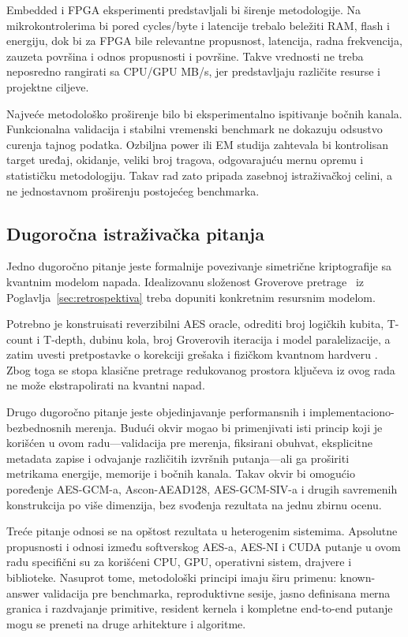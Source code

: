 Embedded i FPGA eksperimenti predstavljali bi širenje metodologije.
Na mikrokontrolerima bi pored cycles/byte i latencije trebalo beležiti
RAM, flash i energiju, dok bi za FPGA bile relevantne propusnost,
latencija, radna frekvencija, zauzeta površina i odnos propusnosti i
površine. Takve vrednosti ne treba neposredno rangirati sa CPU/GPU MB/s,
jer predstavljaju različite resurse i projektne ciljeve.

Najveće metodološko proširenje bilo bi eksperimentalno ispitivanje bočnih
kanala. Funkcionalna validacija i stabilni vremenski benchmark ne dokazuju
odsustvo curenja tajnog podatka. Ozbiljna power ili EM studija zahtevala
bi kontrolisan target uređaj, okidanje, veliki broj tragova, odgovarajuću
mernu opremu i statističku metodologiju. Takav rad zato pripada zasebnoj
istraživačkoj celini, a ne jednostavnom proširenju postojećeg benchmarka.


\subsection{Dugoročna istraživačka pitanja}

Jedno dugoročno pitanje jeste formalnije povezivanje simetrične
kriptografije sa kvantnim modelom napada. Idealizovanu složenost Groverove pretrage~\cite{grover1996} iz
Poglavlja~\ref{sec:retrospektiva} treba dopuniti konkretnim resursnim modelom.

Potrebno je konstruisati reverzibilni AES
oracle, odrediti broj logičkih kubita, T-count i T-depth, dubinu kola,
broj Groverovih iteracija i model paralelizacije, a zatim uvesti pretpostavke
o korekciji grešaka i fizičkom kvantnom hardveru
\cite{GrasslEtAl2016AESQuantum,JaquesEtAl2020GroverAES}.
Zbog toga se stopa klasične pretrage redukovanog prostora ključeva iz ovog rada ne
može ekstrapolirati na kvantni napad.

Drugo dugoročno pitanje jeste objedinjavanje performansnih i
implementaciono-bezbednosnih merenja. Budući okvir mogao bi primenjivati
isti princip koji je korišćen u ovom radu---validacija pre merenja,
fiksirani obuhvat, eksplicitne metadata zapise i odvajanje različitih
izvršnih putanja---ali ga proširiti metrikama energije, memorije i
bočnih kanala. Takav okvir bi omogućio poređenje AES-GCM-a,
Ascon-AEAD128, AES-GCM-SIV-a i drugih savremenih konstrukcija po više
dimenzija, bez svođenja rezultata na jednu zbirnu ocenu.

Treće pitanje odnosi se na opštost rezultata u heterogenim sistemima.
Apsolutne propusnosti i odnosi između softverskog AES-a, AES-NI i CUDA
putanje u ovom radu specifični su za korišćeni CPU, GPU, operativni sistem,
drajvere i biblioteke. Nasuprot tome, metodološki principi imaju širu
primenu: known-answer validacija pre benchmarka, reproduktivne sesije,
jasno definisana merna granica i razdvajanje primitive, resident kernela
i kompletne end-to-end putanje mogu se preneti na druge arhitekture i
algoritme.

